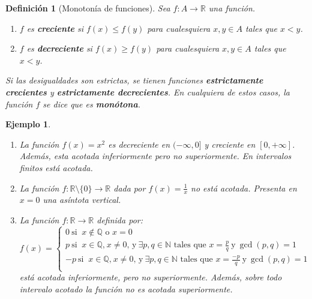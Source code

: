\documentclass{article}
\newtheorem{define}{Definición}
\newtheorem{ejem}{Ejemplo}
\newcommand{\reales}{\mathbb{R}}
\newcommand{\naturales}{\mathbb{N}}
\newcommand{\racionales}{\mathbb{Q}}
\begin{document}
\begin{define}[Monotonía de funciones]
	Sea $f:A \rightarrow \reales$ una función.
	\begin{enumerate}
		\item
		$f$ es \textbf{creciente} si $f(x) \leq f(y)$ para cualesquiera $x,y \in A$ tales que $x < y$.
		\item
		$f$ es \textbf{decreciente} si $f(x) \geq f(y)$ para cualesquiera $x,y \in A$ tales que $x < y$.
	\end{enumerate}
	Si las desigualdades son estrictas, se tienen funciones \textbf{estrictamente crecientes} y \textbf{estrictamente decrecientes}. En cualquiera de estos casos, la función $f$ se dice que es \textbf{monótona}.
\end{define}

\begin{ejem}
	\begin{enumerate}
		\item
		La función $f(x) = x^2$ es decreciente en $(-\infty, 0]$ y creciente en $[0, +\infty]$. Además, esta acotada inferiormente pero no superiormente. En intervalos finitos está acotada.
		\item
		La función $f: \reales \setminus \{ 0\} \rightarrow \reales$ dada por $f(x) = \frac{1}{x}$ no está acotada. Presenta en $x = 0$ una asíntota vertical.
		\item
		La función $f: \reales \rightarrow \reales$ definida por:
		\begin{equation*}
			f(x) = \left\lbrace
			\begin{array}{l}
			0\ \text{si }\ x \not \in \racionales \text{ o } x = 0\\
			p\ \text{si }\ x \in \racionales \text{,}\ x \neq 0 \text{, y}\ \exists p,q \in \naturales \text{ tales que } x = \frac{p}{q}\  \text{y}\ \gcd(p,q) = 1\\
			-p\ \text{si }\ x \in \racionales \text{,}\ x \neq 0 \text{, y}\ \exists p,q \in \naturales \text{ tales que } x = \frac{-p}{q}\  \text{y}\ \gcd(p,q) = 1 \\
			\end{array}
			\right.
		\end{equation*}
		está acotada inferiormente, pero no superiormente. Además, sobre todo intervalo acotado la función no es acotada superiormente.
	\end{enumerate}
\end{ejem}
\end{document}

